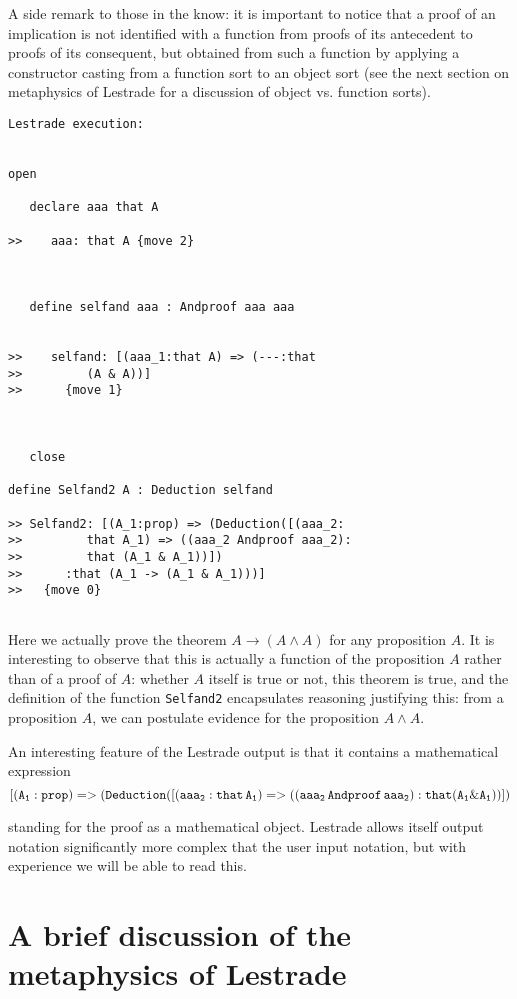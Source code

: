 \documentclass[12pt]{article}
\begin{document}
A side remark to those in the know:  it is important to notice that a proof of an implication is not identified with a function from proofs of its antecedent to proofs of its consequent, but obtained from such a function by applying a constructor casting from a function sort to an object sort (see the next section on metaphysics of Lestrade for a discussion of object vs. function sorts).

\begin{verbatim}Lestrade execution:


open

   declare aaa that A

>>    aaa: that A {move 2}



   define selfand aaa : Andproof aaa aaa


>>    selfand: [(aaa_1:that A) => (---:that
>>         (A & A))]
>>      {move 1}



   close

define Selfand2 A : Deduction selfand

>> Selfand2: [(A_1:prop) => (Deduction([(aaa_2:
>>         that A_1) => ((aaa_2 Andproof aaa_2):
>>         that (A_1 & A_1))])
>>      :that (A_1 -> (A_1 & A_1)))]
>>   {move 0}


\end{verbatim}

Here we actually prove the theorem $A \rightarrow (A \wedge A)$ for any proposition $A$.  It is interesting to observe that this is actually a function of the proposition $A$ rather than of a proof of $A$:  whether $A$ itself is true or not, this theorem is true, and the definition of the function {\tt Selfand2} encapsulates reasoning justifying this:  from a proposition $A$, we can postulate evidence for the proposition $A \wedge A$.

An interesting feature of the Lestrade output is that it contains a mathematical expression $${\tt [(A_1:prop) => (Deduction([(aaa_2: that \,A_1) => ((aaa_2 \,Andproof\, aaa_2): that (A_1 \& A_1))])}$$

standing for the proof as a mathematical object.  Lestrade allows itself output notation significantly more complex that the user input notation, but with experience we will be able to read this.

\section{A brief discussion of the metaphysics of Lestrade}
\end{document}
